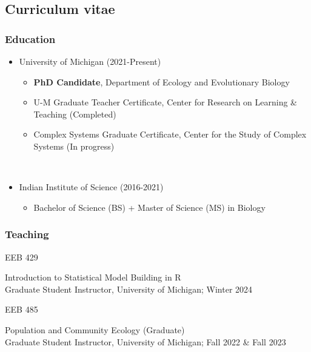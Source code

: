 \documentclass[
  letterpaper,
  DIV=11,
  numbers=noendperiod]{scrartcl}
\author{}
\date{}
\providecommand{\tightlist}{%
  \setlength{\itemsep}{0pt}\setlength{\parskip}{0pt}}\usepackage{longtable,booktabs,array}
\begin{document}
\subsection{Curriculum vitae}\label{curriculum-vitae}

\subsubsection{Education}\label{education}

\begin{itemize}
\tightlist
\item
  University of Michigan (2021-Present)\\

  \begin{itemize}
  \tightlist
  \item
    \textbf{PhD Candidate}, Department of Ecology and Evolutionary
    Biology\\
  \item
    U-M Graduate Teacher Certificate, Center for Research on Learning \&
    Teaching (Completed)\\
  \item
    Complex Systems Graduate Certificate, Center for the Study of
    Complex Systems (In progress)\\
    \strut \\
  \end{itemize}
\item
  Indian Institute of Science (2016-2021)

  \begin{itemize}
  \tightlist
  \item
    Bachelor of Science (BS) + Master of Science (MS) in Biology
  \end{itemize}
\end{itemize}

\subsubsection{Teaching}\label{teaching}

EEB 429

Introduction to Statistical Model Building in R\\
Graduate Student Instructor, University of Michigan; Winter 2024

EEB 485

Population and Community Ecology (Graduate)\\
Graduate Student Instructor, University of Michigan; Fall 2022 \& Fall
2023
\end{document}
